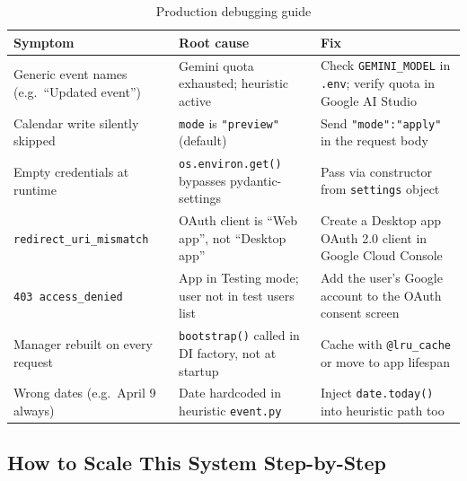 \documentclass[12pt, a4paper]{article}
\begin{document}
\begin{table}[htbp]
\centering
\small
\renewcommand{\arraystretch}{1.45}
\begin{tabularx}{\textwidth}{L{3.8cm} L{3.8cm} X}
\toprule
\textbf{Symptom} & \textbf{Root cause} & \textbf{Fix} \\
\midrule
Generic event names (e.g.\ ``Updated event'')
  & Gemini quota exhausted; heuristic active
  & Check \texttt{GEMINI\_MODEL} in \texttt{.env}; verify quota in Google AI Studio \\
Calendar write silently skipped
  & \texttt{mode} is \texttt{"preview"} (default)
  & Send \texttt{"mode":"apply"} in the request body \\
Empty credentials at runtime
  & \texttt{os.environ.get()} bypasses pydantic-settings
  & Pass via constructor from \texttt{settings} object \\
\texttt{redirect\_uri\_}\newline\texttt{mismatch}
  & OAuth client is ``Web app'', not ``Desktop app''
  & Create a Desktop app OAuth 2.0 client in Google Cloud Console \\
\texttt{403 access\_denied}
  & App in Testing mode; user not in test users list
  & Add the user's Google account to the OAuth consent screen \\
Manager rebuilt on every request
  & \texttt{bootstrap()} called in DI factory, not at startup
  & Cache with \texttt{@lru\_cache} or move to app lifespan \\
Wrong dates (e.g.\ April 9 always)
  & Date hardcoded in heuristic \texttt{event.py}
  & Inject \texttt{date.today()} into heuristic path too \\
\bottomrule
\end{tabularx}
\caption{Production debugging guide}
\end{table}

\subsection{How to Scale This System Step-by-Step}
\end{document}
